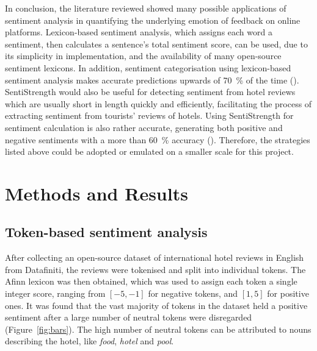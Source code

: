 \documentclass[11pt, a4paper]{pancake-article}
\begin{document}
In conclusion, the literature reviewed showed many possible applications
of sentiment analysis in quantifying the underlying emotion of feedback
on online platforms. Lexicon-based sentiment analysis, which assigns each
word a sentiment, then calculates a sentence's total sentiment score, can
be used, due to its simplicity in implementation, and the availability of
many open-source sentiment lexicons. In addition, sentiment categorisation
using lexicon-based sentiment analysis makes accurate predictions upwards of
\qty{70}{\percent} of the time (\cite{khoo}). SentiStrength would also be useful for
detecting sentiment from hotel reviews which are usually short in length quickly
and efficiently, facilitating the process of extracting sentiment from tourists'
reviews of hotels. Using SentiStrength for sentiment calculation is also
rather accurate, generating both positive and negative sentiments with a more
than \qty{60}{\percent} accuracy (\cite{thelwall}). Therefore, the strategies listed
above could be adopted or emulated on a smaller scale for this project.

\section{Methods and Results}

\subsection{Token-based sentiment analysis}\label{sec:tokens}
After collecting an open-source dataset of international hotel reviews in English from Datafiniti,
the reviews were tokenised and split into individual tokens. The Afinn lexicon was then obtained,
which was used to assign each token a single integer score, ranging from \(\left[-5, -1\right]\) for
negative tokens, and \(\left[1, 5\right]\) for positive ones. It was found that the vast majority
of tokens in the dataset held a positive sentiment  after a large number of neutral tokens were disregarded
(Figure~\ref{fig:bars}). The high number of neutral tokens can be attributed to nouns
describing the hotel, like \textit{food}, \textit{hotel} and \textit{pool}.
\end{document}
